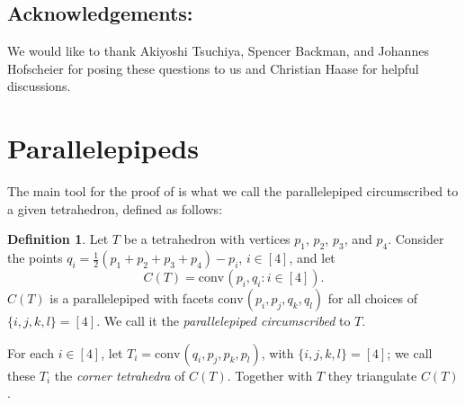 \documentclass{amsart}
\theoremstyle{plain}
\newtheorem{theorem}{Theorem}[section]
\theoremstyle{definition}
\newtheorem{definition}[theorem]{Definition}
\newcommand{\Z}{ \ensuremath{\mathbb{Z}}}
\newcommand{\conv}{\ensuremath{\mathrm{conv}}\hspace{1pt}}
\newcommand{\paco}[1]{\todo[size=\tiny,color=green!30]{#1 \\ \hfill --- P.}}
\begin{document}



\subsection*{Acknowledgements:} We would like to thank Akiyoshi Tsuchiya, Spencer Backman, and Johannes Hofscheier for posing these questions to us and Christian Haase for helpful discussions.


\section{Parallelepipeds}
\label{sec:parallelepipeds}

The main tool for the proof of  is what we call the parallelepiped circumscribed to a given tetrahedron, defined as follows:

\begin{definition}
\label{def:circunpara}
Let $T$ be a tetrahedron with vertices $p_1$, $p_2$, $p_3$, and $p_4$. Consider the points $q_i= \frac12 (p_1+p_2+p_3+p_4) - p_i$, $i\in [4]$, and let
\[
C(T)=\conv(p_i,q_i: i\in[4]).
\] 
$C(T)$ is a parallelepiped with facets $\conv(p_i, p_j, q_k, q_l)$ for all choices of $\{i,j,k,l\}=[4]$. We call it the \emph{parallelepiped circumscribed} to $T$.

For each $i \in [4]$, let $T_i=\conv(q_i, p_j, p_k, p_l)$, with $\{i,j,k,l\}=[4]$; we call these $T_i$ the \emph{corner tetrahedra} of $C(T)$. Together with $T$ they triangulate $C(T)$.
\end{definition}
\end{document}
